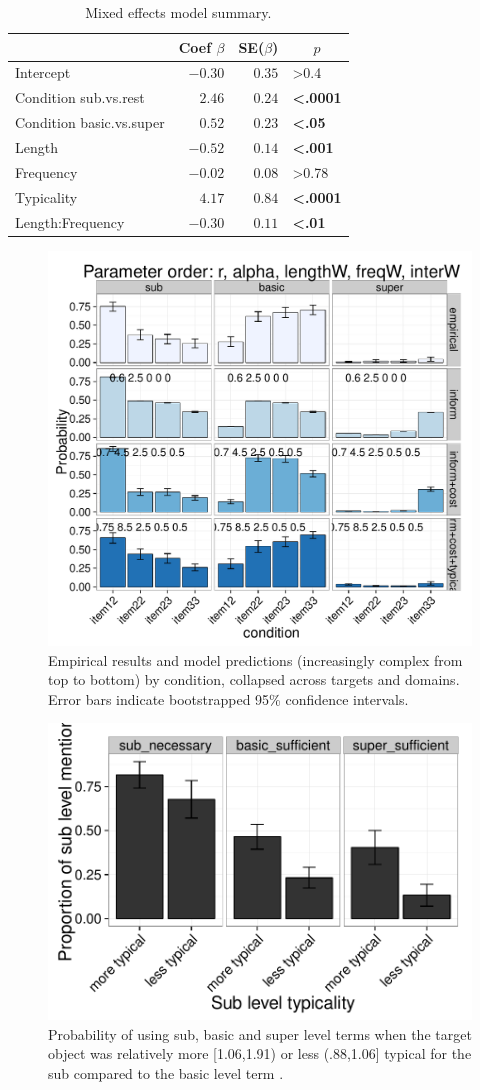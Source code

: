 \documentclass[10pt,letterpaper]{article}
\begin{document}
\begin{table}[!tbp]
\caption{Mixed effects model summary.}
\begin{center}
\begin{tabular}{lrrl}
\toprule
\multicolumn{1}{l}{}&\multicolumn{1}{c}{Coef $\beta$}&\multicolumn{1}{c}{SE($\beta$)}&\multicolumn{1}{c}{$p$}\tabularnewline
\midrule
Intercept&$-0.30$&$0.35$&\textgreater0.4\tabularnewline
Condition sub.vs.rest&$ 2.46$&$0.24$&\textbf{\textless.0001}\tabularnewline
Condition basic.vs.super&$ 0.52$&$0.23$&\textbf{\textless.05}\tabularnewline
Length&$-0.52$&$0.14$&\textbf{\textless.001}\tabularnewline
Frequency&$-0.02$&$0.08$&\textgreater0.78\tabularnewline
Typicality&$ 4.17$&$0.84$&\textbf{\textless.0001}\tabularnewline
Length:Frequency&$-0.30$&$0.11$&\textbf{\textless.01}\tabularnewline
\bottomrule
\end{tabular}\end{center}
\label{tab:modelresults}
\end{table}


\begin{figure}[ht!]
\centering
\includegraphics[width=.5\textwidth]{graphs/collapsed-pattern}
\caption{Empirical results and model predictions (increasingly complex from top to bottom) by condition, collapsed across targets and domains. Error bars indicate bootstrapped 95\% confidence intervals.}
\label{fig:qualitativemodel}
\end{figure}

\begin{figure}[ht!]
\centering
\includegraphics[width=.5\textwidth]{graphs/typicality-effect}
\caption{Probability of using sub, basic and super level terms when the target object was relatively more [1.06,1.91) or less (.88,1.06] typical for the sub compared to the basic level term .}
 \label{fig:typicalityeffect}
\end{figure}
\end{document}
